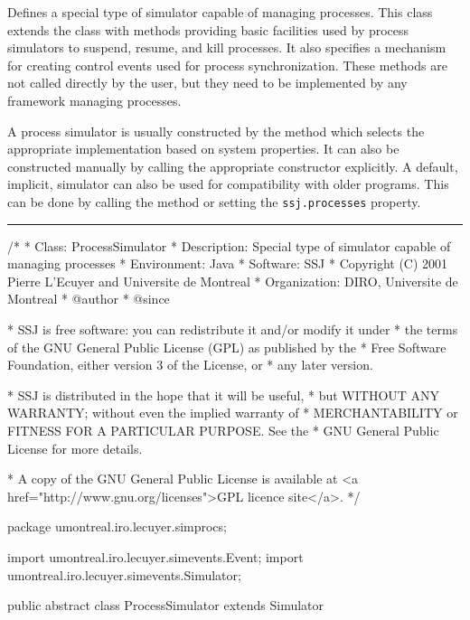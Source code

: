 
Defines a special type of simulator capable of managing processes.
This class extends the  class
with methods providing basic facilities used by process simulators
to suspend, resume, and kill processes.
It also specifies a mechanism for creating control events used for process synchronization.
These methods are not called directly by the user, but they
need to be implemented by any framework managing processes.

A process simulator is usually constructed by the  method which
selects the appropriate implementation based on system properties.
It can also be constructed manually  by calling the appropriate constructor explicitly.
A default, implicit, simulator can also be used for compatibility with older programs.
This can be done by calling the  method or setting the
\texttt{ssj.processes} property.

\bigskip\hrule

\begin{code}

\begin{hide}
/*
 * Class:        ProcessSimulator
 * Description:  Special type of simulator capable of managing processes
 * Environment:  Java
 * Software:     SSJ 
 * Copyright (C) 2001  Pierre L'Ecuyer and Universite de Montreal
 * Organization: DIRO, Universite de Montreal
 * @author       
 * @since

 * SSJ is free software: you can redistribute it and/or modify it under
 * the terms of the GNU General Public License (GPL) as published by the
 * Free Software Foundation, either version 3 of the License, or
 * any later version.

 * SSJ is distributed in the hope that it will be useful,
 * but WITHOUT ANY WARRANTY; without even the implied warranty of
 * MERCHANTABILITY or FITNESS FOR A PARTICULAR PURPOSE.  See the
 * GNU General Public License for more details.

 * A copy of the GNU General Public License is available at
   <a href="http://www.gnu.org/licenses">GPL licence site</a>.
 */
\end{hide}
package umontreal.iro.lecuyer.simprocs;\begin{hide}

import umontreal.iro.lecuyer.simevents.Event;
import umontreal.iro.lecuyer.simevents.Simulator;
\end{hide}

public abstract class ProcessSimulator extends Simulator \begin{hide} {

   protected SimProcess currentProcess;
   // The process who has control right now (current process).
   // If no process has control (an event is executing), current = null.
\end{hide}
\end{code}

